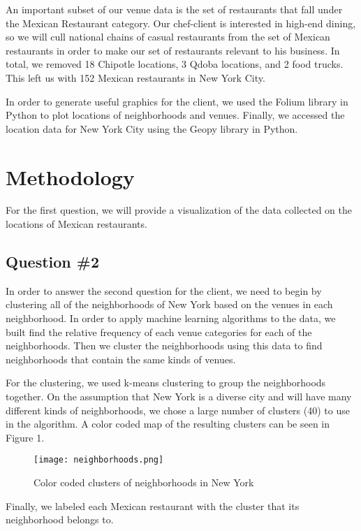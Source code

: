 \documentclass{article}
\begin{document}
An important subset of our venue data is the set of restaurants that fall under the Mexican Restaurant category. Our chef-client is interested in high-end dining, so we will cull national chains of casual restaurants from the set of Mexican restaurants in order to make our set of restaurants relevant to his business. In total, we removed 18 Chipotle locations, 3 Qdoba locations, and 2 food trucks. This left us with 152 Mexican restaurants in New York City.

In order to generate useful graphics for the client, we used the Folium library in Python to plot locations of neighborhoods and venues. Finally, we accessed the location data for New York City using the Geopy library in Python.

\section{Methodology}

For the first question, we will provide a visualization of the data collected on the locations of Mexican restaurants.

\subsection{Question \#2}

In order to answer the second question for the client, we need to begin by clustering all of the neighborhoods of New York based on the venues in each neighborhood. In order to apply machine learning algorithms to the data, we built find the relative frequency of each venue categories for each of the neighborhoods. Then we cluster the neighborhoods using this data to find neighborhoods that contain the same kinds of venues.

For the clustering, we used k-means clustering to group the neighborhoods together. On the assumption that New York is a diverse city and will have many different kinds of neighborhoods, we chose a large number of clusters (40) to use in the algorithm. A color coded map of the resulting clusters can be seen in Figure 1.

\begin{figure}[h!]
\label{fig1}
\texttt{[image: neighborhoods.png]}
\centering
\caption{Color coded clusters of neighborhoods in New York}
\end{figure}

Finally, we labeled each Mexican restaurant with the cluster that its neighborhood belongs to.
\end{document}
